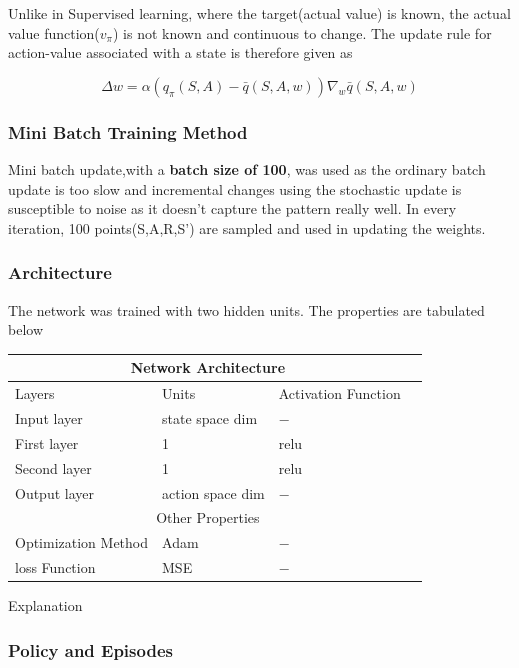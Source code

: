 \documentclass[12pt]{article}
\begin{document}
Unlike in Supervised learning, 
where the target(actual value)  is known, the actual value function($v_\pi$) is not known and continuous to 
change.  The update rule for action-value associated with a state is therefore given as

\begin{equation}
  \Delta w = \alpha(q_\pi(S,A)-\bar{q}(S,A,w))\nabla_{w}\bar{q}(S,A,w)
\end{equation}

\subsubsection{Mini Batch Training Method}
Mini batch update,with a \textbf{batch size of 100},  was used as the ordinary batch update is too slow and incremental changes using
the stochastic update is susceptible to noise as it doesn't capture the pattern really well. In every iteration, 100 points(S,A,R,S') are 
sampled and used in updating the weights.


\subsubsection{Architecture} 
The network was trained with two hidden units. The properties are tabulated below

\begin{table}[h]
  \centering
\begin{tabular}{ |p{3cm}||p{3cm}|p{3cm}|p{3cm}|  }
 \hline
 \multicolumn{3}{|c|}{Network Architecture} \\
 \hline
 Layers     & Units & Activation Function \\
 \hline
 Input layer  & state space dim & $-$ \\
 First layer  & 1 & relu \\
 Second layer & 1 & relu \\
 Output layer & action space dim & $-$ \\
 \hline
 \multicolumn{3}{|c|}{Other Properties} \\
 \hline
 Optimization Method &Adam & $-$ \\
 \hline
 loss Function &MSE &$-$ \\
 \hline
\end{tabular}
\end{table}

Explanation

\subsubsection{Policy and Episodes}
\end{document}

